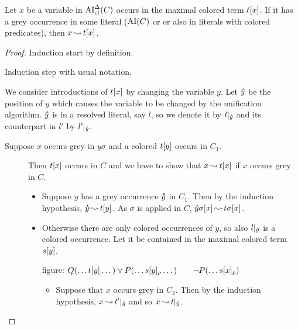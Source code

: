 \documentclass[,%
	paper=a4,%
	DIV9, %
	twoside=false,%
	liststotoc,
	bibtotoc,
	draft=false,%
	numbers=noendperiod
]{scrartcl}
\begin{document}



\begin{lemma}
	\label{lemma:arrow_from_grey_to_colored}
	Let $x$ be a variable in $\operatorname{AI}_\mathrm{cl}^\Delta(C)$ occurs in the maximal colored term $t[x]$.
	If it has a grey occurrence in some literal ($\operatorname{AI}(C)$ or or also in literals with colored predicates), then $x\operatorname{\leadsto} t[x]$.
\end{lemma}
\begin{proof}
	Induction start by definition.

	Induction step with usual notation.

	We consider introductions of $t[x]$ by changing the variable $y$.
	Let $\bm\hat y$ be the position of $y$ which causes the variable to be changed by the unification algorithm.
	$\bm\hat y$ is in a resolved literal, say $l$, so we denote it by $l|_{\bm\hat y}$ and its counterpart in $l'$ by $l'|_{\bm\hat y}$. 

	\begin{description}
		\item[Suppose $x$ occurs grey in $y\sigma$ and a colored $t[y]$ occurs in $C_1$.]
			Then $t[x]$ occurs in $C$ and we have to show that $x\operatorname{\leadsto} t[x]$ if $x$ occurs grey in $C$.

			\begin{itemize}
				\item Suppose $y$ has a grey occurrence $\bm\dot y$ in $C_1$.
					Then by the induction hypothesis, $\bm\dot y\operatorname{\leadsto} t[y]$. 
					As $\sigma$ is applied in $C$, $\bm\dot y\sigma[x]\operatorname{\leadsto} t\sigma[x]$.

				\item Otherwise there are only colored occurrences of $y$, so also $l|_{\bm\hat y}$ is a colored occurrence. Let it be contained in the maximal colored term $s[y]$.

					figure: $Q(\dots t[y] \dots) \lor P(\dots s{[y]_{p}} \dots)\quad\quad \lnot P(\dots s{[x]_{p}})$

					\begin{itemize}
						\item Suppose that $x$ occurs grey in $C_2$. Then by the induction hypothesis, $x\operatorname{\leadsto} l'|_{\bm\hat y}$ and so
							$x\operatorname{\leadsto} l|_{\bm\hat y}$.


\end{itemize}
\end{itemize}
\end{description}
\end{proof}
\end{document}
